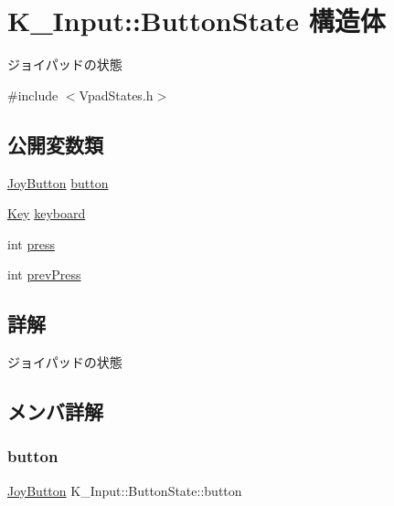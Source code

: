\hypertarget{struct_k___input_1_1_button_state}{}\section{K\+\_\+\+Input\+:\+:Button\+State 構造体}
\label{struct_k___input_1_1_button_state}


ジョイパッドの状態  




{\ttfamily \#include $<$Vpad\+States.\+h$>$}

\subsection*{公開変数類}
\begin{DoxyCompactItemize}
\item 
\mbox{\hyperlink{namespace_k___input_a0fad93a64181d6776849d43118c26902}{Joy\+Button}} \mbox{\hyperlink{struct_k___input_1_1_button_state_a7f22bf8e7e2078e45af31f7a1f3a7d2d}{button}}
\item 
\mbox{\hyperlink{namespace_k___input_af62d80c77b12db01035e4b9aa27a09d6}{Key}} \mbox{\hyperlink{struct_k___input_1_1_button_state_a98dffa8b4114f7dfef0750b6444713cb}{keyboard}}
\item 
int \mbox{\hyperlink{struct_k___input_1_1_button_state_a8c2311c266401355c0ff149bd23a2f66}{press}}
\item 
int \mbox{\hyperlink{struct_k___input_1_1_button_state_aec5fd955922f378e854cf9d39877113c}{prev\+Press}}
\end{DoxyCompactItemize}


\subsection{詳解}
ジョイパッドの状態 

\subsection{メンバ詳解}
\mbox{\label{struct_k___input_1_1_button_state_a7f22bf8e7e2078e45af31f7a1f3a7d2d}} 
\subsubsection{\texorpdfstring{button}{button}}
{\footnotesize\ttfamily \mbox{\hyperlink{namespace_k___input_a0fad93a64181d6776849d43118c26902}{Joy\+Button}} K\+\_\+\+Input\+::\+Button\+State\+::button}

